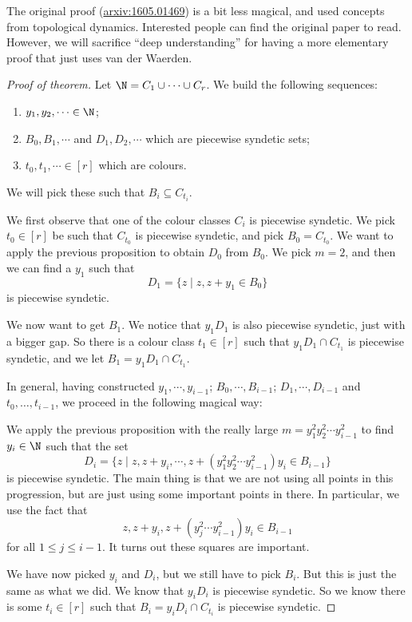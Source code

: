 \documentclass[a4paper]{article}
\begin{document}
The original proof (\href{https://arxiv.org/abs/1605.01469}{arxiv:1605.01469}) is a bit less magical, and used concepts from topological dynamics. Interested people can find the original paper to read. However, we will sacrifice ``deep understanding'' for having a more elementary proof that just uses van der Waerden.

\begin{proof}[Proof of theorem]
  Let $\N = C_1 \cup \cdots \cup C_r$. We build the following sequences:
  \begin{enumerate}
    \item $y_1, y_2, \cdots \in \N$;
    \item $B_0, B_1, \cdots$ and $D_1, D_2, \cdots$ which are piecewise syndetic sets;
    \item $t_0, t_1, \cdots \in [r]$ which are colours.
  \end{enumerate}
  We will pick these such that $B_i \subseteq C_{t_i}$.

  We first observe that one of the colour classes $C_i$ is piecewise syndetic. We pick $t_0 \in [r]$ be such that $C_{t_0}$ is piecewise syndetic, and pick $B_0 = C_{t_0}$. We want to apply the previous proposition to obtain $D_0$ from $B_0$. We pick $m = 2$, and then we can find a $y_1$ such that
  \[
    D_1 = \{z \mid z, z + y_1 \in B_0\}
  \]
  is piecewise syndetic.

  We now want to get $B_1$. We notice that $y_1 D_1$ is also piecewise syndetic, just with a bigger gap. So there is a colour class $t_1 \in [r]$ such that $y_1 D_1 \cap C_{t_1}$ is piecewise syndetic, and we let $B_1 = y_1 D_1 \cap C_{t_1}$.

  In general, having constructed $y_1, \cdots, y_{i - 1}$; $B_0, \cdots, B_{i - 1}$; $D_1, \cdots, D_{i - 1}$ and $t_0, \ldots, t_{i - 1}$, we proceed in the following magical way:

  We apply the previous proposition with the really large $m = y_1^2 y_2^2 \cdots y_{i - 1}^2$ to find $y_i \in \N$ such that the set
  \[
    D_i = \{z\mid z, z + y_i, \cdots, z + (y_1^2 y_2^2 \cdots y_{i - 1}^2) y_i \in B_{i - 1} \}
  \]
  is piecewise syndetic. The main thing is that we are not using all points in this progression, but are just using some important points in there. In particular, we use the fact that
  \[
    z, z + y_i, z + (y_j^2 \cdots y_{i - 1}^2)y_i \in B_{i - 1}
  \]
  for all $1 \leq j \leq i - 1$. It turns out these squares are important.

  We have now picked $y_i$ and $D_i$, but we still have to pick $B_i$. But this is just the same as what we did. We know that $y_i D_i$ is piecewise syndetic. So we know there is some $t_i \in [r]$ such that $B_i = y_i D_i \cap C_{t_i}$ is piecewise syndetic.


\end{proof}
\end{document}
